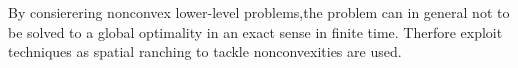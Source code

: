 By consierering nonconvex lower-level problems,the problem can in general not to be solved to a global optimality in an exact sense in finite time.
Therfore exploit techniques as spatial ranching to tackle nonconvexities are used. 